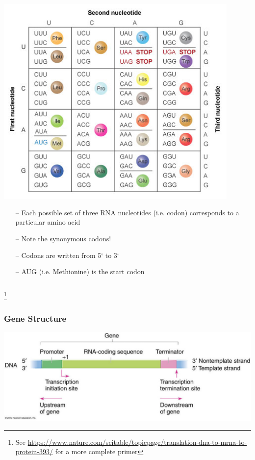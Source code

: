 \documentclass{beamer}
\newcommand\blfootnote[1]{%
	\begingroup
	\renewcommand\thefootnote{}\footnote{#1}%
	\addtocounter{footnote}{-1}%
	\endgroup
}
\begin{document}
\begin{frame}
\begin{columns}
\begin{column}{0.5\textwidth}
	\centering	\includegraphics[keepaspectratio, width  = 0.9\textwidth]{img/geneticCode}\\
	\scriptsize			\begin{itemize}
		\item[--] Each possible set of three RNA nucleotides (i.e. codon) corresponds to a particular amino acid
		\item[--] Note the synonymous codons!
		\item[--] Codons are written from 5` to 3`				
		\item[--] AUG (i.e. Methionine) is the start codon
	\end{itemize}			
	\end{column}
	\end{columns}
	
	\blfootnote{See \url{https://www.nature.com/scitable/topicpage/translation-dna-to-mrna-to-protein-393/} for a more complete primer}
\end{frame}


\begin{frame}
	\frametitle{Gene Structure}
	
	\centering	\includegraphics[keepaspectratio, width  = \textwidth]{img/geneStructure}\\ 

\end{frame}
\end{document}
